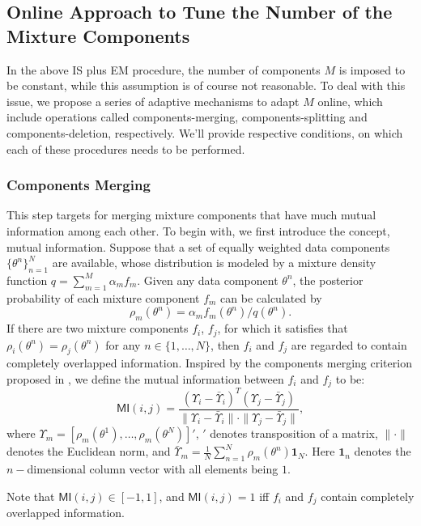 \documentclass[aoas]{imsart}
\def\MI{\textsf{MI}}
\begin{document}
\subsection {Online Approach to Tune the Number of the Mixture Components}

In the above IS plus EM procedure, the number of components $M$ is
imposed to be constant, while this assumption is of course not
reasonable. To deal with this issue, we propose a series of adaptive
mechanisms to adapt $M$ online, which include operations called
components-merging, components-splitting and components-deletion,
respectively. We'll provide respective conditions, on which each of
these procedures needs to be performed.

\subsubsection{Components Merging}
This step targets for merging mixture components that have much
mutual information among each other. To begin with, we first
introduce the concept, mutual information. Suppose that a set of
equally weighted data components $\{\theta^n\}_{n=1}^N$ are
available, whose distribution is modeled by a mixture density
function $q=\sum_{m=1}^M\alpha_mf_m$. Given any data component
$\theta^n$, the posterior probability of each mixture component
$f_m$ can be calculated by
\begin{equation}
\rho_m(\theta^n)=\alpha_m f_m(\theta^n)/q(\theta^n).
\end{equation}
If there are two mixture components $f_i$, $f_j$, for which it
satisfies that $\rho_i(\theta^n)=\rho_j(\theta^n)$ for any
$n\in\{1,\ldots,N\}$, then $f_i$ and $f_j$ are regarded to contain
completely overlapped information. Inspired by the components
merging criterion proposed in \cite{ueda2000sam,wang2004estimation},
we define the mutual information between $f_i$ and $f_j$ to be:
\begin{equation}\label{mutual_info}
\MI(i,j)=\frac{(\Upsilon_i-\bar{\Upsilon}_i)^T(\Upsilon_j-\bar{\Upsilon}_j)}{\|\Upsilon_i-\bar{\Upsilon}_i\|\cdot\|\Upsilon_j-\bar{\Upsilon}_j\|},
\end{equation}
 where
$\Upsilon_m=[\rho_m(\theta^1),\ldots,\rho_m(\theta^N)]'$, $'$
denotes transposition of a matrix, $\|\cdot\|$ denotes the Euclidean
norm, and $\bar{\Upsilon}_m=\frac{1}{N}\sum_{n=1}^N
\rho_m(\theta^n)\textbf{1}_N$. Here $\textbf{1}_n$ denotes the
$n-$dimensional column vector with all elements being $1$.

Note that $\MI(i,j)\in[-1,1]$, and $\MI(i,j)=1$ iff $f_i$ and $f_j$
contain completely overlapped information.
\end{document}
